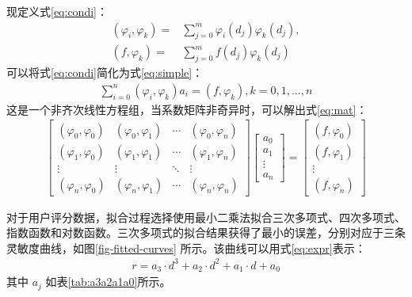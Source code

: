 现定义式\eqref{eq:condi}：
\begin{equation}
\begin{aligned}
(\varphi_i,\varphi_k) =& \sum^{m}_{j=0}\varphi_i(d_j)\varphi_k(d_j),\\ 
(f,\varphi_k) =& \sum^{m}_{j=0}f(d_j)\varphi_k(d_j)
\end{aligned}
\label{eq:condi}
\end{equation}
可以将式\eqref{eq:condi}简化为式\eqref{eq:simple}：
\begin{equation}
\begin{aligned}
\sum^{n}_{i=0}(\varphi_i,\varphi_k)a_i = (f,\varphi_k), k = 0, 1, ..., n
\end{aligned}
\label{eq:simple}
\end{equation}
这是一个非齐次线性方程组，当系数矩阵非奇异时，可以解出式\eqref{eq:mat}：
\begin{equation}
\begin{aligned}
\begin{bmatrix}  
  (\varphi_0,\varphi_0) & (\varphi_0,\varphi_1) & \cdots & (\varphi_0,\varphi_n) \\  
  (\varphi_1,\varphi_0) & (\varphi_1,\varphi_1) & \cdots & (\varphi_1,\varphi_n) \\  
  \vdots & \vdots & \ddots & \vdots \\  
  (\varphi_n,\varphi_0) & (\varphi_n,\varphi_1) & \cdots & (\varphi_n,\varphi_n)  
\end{bmatrix} \begin{bmatrix}  
   a_0 \\  
  a_1 \\  
  \vdots \\  
  a_n  
\end{bmatrix}  = \begin{bmatrix}  
   (f,\varphi_0) \\  
  (f,\varphi_1) \\  
  \vdots \\  
  (f,\varphi_n)
\end{bmatrix}\end{aligned}
\label{eq:mat}
\end{equation}

对于用户评分数据，拟合过程选择使用最小二乘法拟合三次多项式、四次多项式、指数函数和对数函数。三次多项式的拟合结果获得了最小的误差，分别对应于三条灵敏度曲线，如图\ref{fig-fitted-curves} 所示。该曲线可以用式\eqref{eq:expr}表示：
\begin{equation}
\begin{aligned}
r = a_3 \cdot d^{3} + a_2 \cdot d^{2} + a_1 \cdot d + a_0
\end{aligned}
\label{eq:expr}
\end{equation}
其中 $a_j$ 如表\ref{tab:a3a2a1a0}所示。



